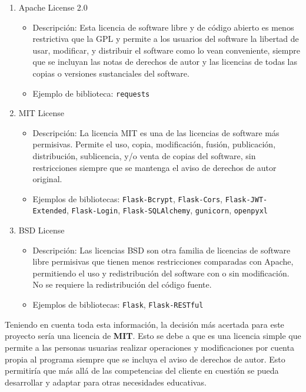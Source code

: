 \begin{itemize}
\begin{enumerate}
    \item Apache License 2.0
    \begin{itemize}
        \item Descripción: Esta licencia de software libre y de código abierto es menos restrictiva que la GPL y permite a los usuarios del software la libertad de usar, modificar, y distribuir el software como lo vean conveniente, siempre que se incluyan las notas de derechos de autor y las licencias de todas las copias o versiones sustanciales del software.~\cite{apache_license}
        \item Ejemplo de biblioteca: \verb|requests|
    \end{itemize}
    \item MIT License
    \begin{itemize}
        \item Descripción: La licencia MIT es una de las licencias de software más permisivas. Permite el uso, copia, modificación, fusión, publicación, distribución, sublicencia, y/o venta de copias del software, sin restricciones siempre que se mantenga el aviso de derechos de autor original.\cite{mit_license}
        \item Ejemplos de bibliotecas: \verb|Flask-Bcrypt|, \verb|Flask-Cors|, \verb|Flask-JWT-Extended|, \verb|Flask-Login|, \verb|Flask-SQLAlchemy|, \verb|gunicorn|, \verb|openpyxl|
    \end{itemize}
    \item BSD License
    \begin{itemize}
        \item Descripción: Las licencias BSD son otra familia de licencias de software libre permisivas que tienen menos restricciones comparadas con Apache, permitiendo el uso y redistribución del software con o sin modificación. No se requiere la redistribución del código fuente.\cite{bsd_license}
        \item Ejemplos de bibliotecas: \verb|Flask|, \verb|Flask-RESTful|
    \end{itemize}
\end{enumerate}
 
\end{itemize}

Teniendo en cuenta toda esta información, la decisión más acertada para este proyecto sería una licencia de \textbf{MIT}. Esto se debe a que es una licencia simple que permite a las personas usuarias realizar operaciones y modificaciones por cuenta propia al programa siempre que se incluya el aviso de derechos de autor.
Esto permitiría que más allá de las competencias del cliente en cuestión se pueda desarrollar y adaptar para otras necesidades educativas.

